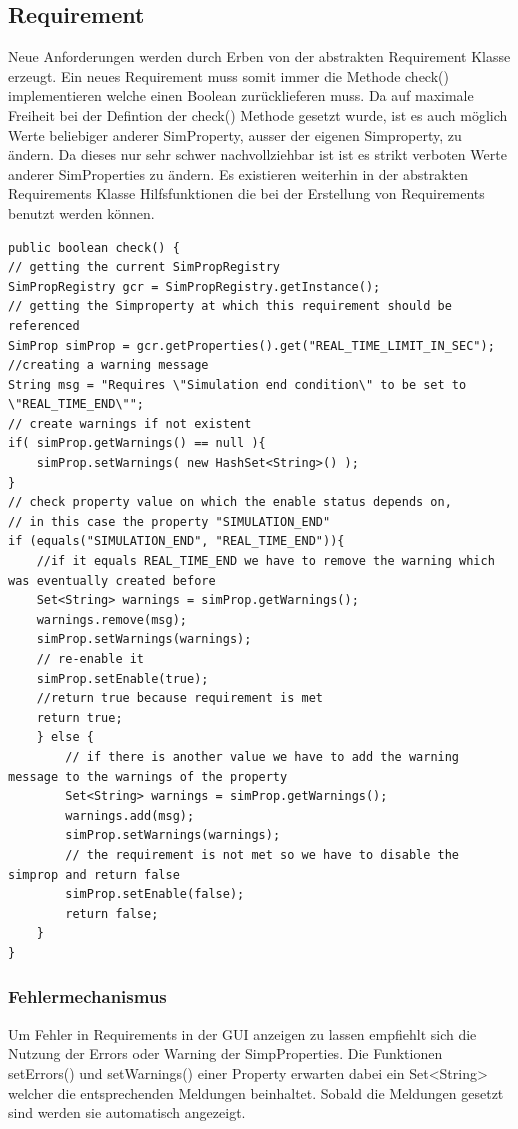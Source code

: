 \documentclass[a4paper, 11pt]{article} %
\begin{document}
\subsection{Requirement}
\label{ssub:Requirements}
Neue Anforderungen werden durch Erben von der abstrakten Requirement Klasse erzeugt. Ein neues Requirement muss somit immer die Methode check() implementieren welche einen Boolean zurücklieferen muss. Da auf maximale Freiheit bei der Defintion der check() Methode gesetzt wurde, ist es auch möglich Werte beliebiger anderer SimProperty, ausser der eigenen Simproperty, zu ändern. Da dieses nur sehr schwer nachvollziehbar ist ist es strikt verboten Werte anderer SimProperties zu ändern.
Es existieren weiterhin in der abstrakten Requirements Klasse Hilfsfunktionen die bei der Erstellung von Requirements benutzt werden können.
\lstset{language=Java}
\begin{lstlisting}[caption={Beispiel: check() Methode einer Enable Anforderung}]
public boolean check() {
// getting the current SimPropRegistry
SimPropRegistry gcr = SimPropRegistry.getInstance();
// getting the Simproperty at which this requirement should be referenced
SimProp simProp = gcr.getProperties().get("REAL_TIME_LIMIT_IN_SEC");
//creating a warning message
String msg = "Requires \"Simulation end condition\" to be set to \"REAL_TIME_END\"";
// create warnings if not existent
if( simProp.getWarnings() == null ){
	simProp.setWarnings( new HashSet<String>() );
}
// check property value on which the enable status depends on,
// in this case the property "SIMULATION_END"
if (equals("SIMULATION_END", "REAL_TIME_END")){
	//if it equals REAL_TIME_END we have to remove the warning which was eventually created before
	Set<String> warnings = simProp.getWarnings();
	warnings.remove(msg);
	simProp.setWarnings(warnings);
	// re-enable it
	simProp.setEnable(true);
	//return true because requirement is met
	return true;
	} else {
		// if there is another value we have to add the warning message to the warnings of the property
		Set<String> warnings = simProp.getWarnings();
		warnings.add(msg);
		simProp.setWarnings(warnings);
		// the requirement is not met so we have to disable the simprop and return false
		simProp.setEnable(false);
		return false;
	}
}
\end{lstlisting}
\subsubsection{Fehlermechanismus}
Um Fehler in Requirements in der GUI anzeigen zu lassen empfiehlt sich die Nutzung der Errors oder Warning der SimpProperties. Die Funktionen setErrors() und setWarnings() einer Property erwarten dabei ein Set<String> welcher die entsprechenden Meldungen beinhaltet. Sobald die Meldungen gesetzt sind werden sie automatisch angezeigt. 
\end{document}
